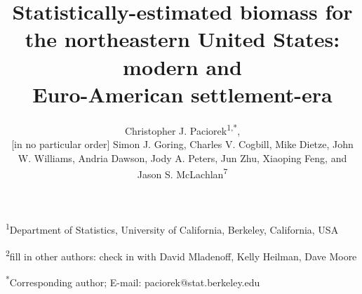 \documentclass[12pt]{article}\usepackage[]{graphicx}\usepackage[]{color}
\newcommand{\lyxaddress}[1]{
\par {\raggedright #1
\vspace{1.4em}
\noindent\par}
}
\begin{document}
\title{Statistically-estimated biomass for the northeastern United States:
modern and \\
Euro-American settlement-era}


\author{Christopher J. Paciorek\textsuperscript{1,{*}}, \\
{[}in no particular order{]} Simon J. Goring, Charles V. Cogbill,
Mike Dietze, John W. Williams, Andria Dawson, Jody A. Peters, Jun
Zhu, Xiaoping Feng, and Jason S. McLachlan\textsuperscript{7}}

\maketitle

\lyxaddress{\textsuperscript{1}Department of Statistics, University of California,
Berkeley, California, USA}


\lyxaddress{\textsuperscript{2}fill in other authors: check in with David Mladenoff,
Kelly Heilman, Dave Moore}


\lyxaddress{\textsuperscript{{*}}Corresponding author; E-mail: paciorek@stat.berkeley.edu}


\lyxaddress{\newpage}
\begin{quote}

\end{quote}
\end{document}
